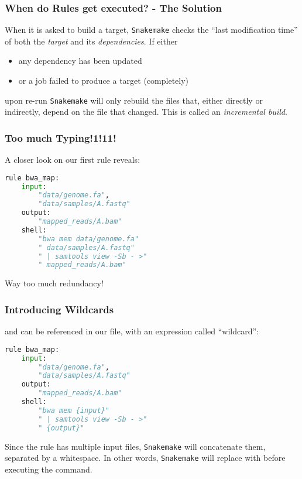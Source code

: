 \begin{frame}
  \frametitle{When do Rules get executed? - The Solution}
  When it is asked to build a target, \texttt{Snakemake} checks the “last modification time” of both the \emph{target} and its \emph{dependencies}.
  If either
  \begin{itemize}
   \item any dependency has been updated
   \item or a job failed to produce a target (completely)
  \end{itemize}
  upon re-run \texttt{Snakemake} will only rebuild the files that, either directly or indirectly, depend on the file that changed. This is called an \emph{incremental build}.
  \pause
\end{frame}

\begin{frame}[fragile]
  \frametitle{Too much Typing!1!11!}
  A closer look on our first rule reveals:
  \begin{lstlisting}[language=Python,style=Python]
rule bwa_map:
    input:
        "data/genome.fa",
        "data/samples/A.fastq"
    output:
        "mapped_reads/A.bam"
    shell:
        "bwa mem data/genome.fa"
        " data/samples/A.fastq"
        " | samtools view -Sb - >"
        " mapped_reads/A.bam"
    \end{lstlisting}
    \bcattention Way too much redundancy!
\end{frame}

\begin{frame}[fragile]
  \frametitle{Introducing Wildcards}
   and  can be referenced in our file, with an expression called ``wildcard'':
  \begin{lstlisting}[language=Python,style=Python]
rule bwa_map:
    input:
        "data/genome.fa",
        "data/samples/A.fastq"
    output:
        "mapped_reads/A.bam"
    shell:
        "bwa mem {input}"
        " | samtools view -Sb - >"
        " {output}"
    \end{lstlisting}
    Since the rule has multiple input files, \texttt{Snakemake} will concatenate them, separated by a whitespace. In other words, \texttt{Snakemake} will replace  with  before executing the command. 
\end{frame}

